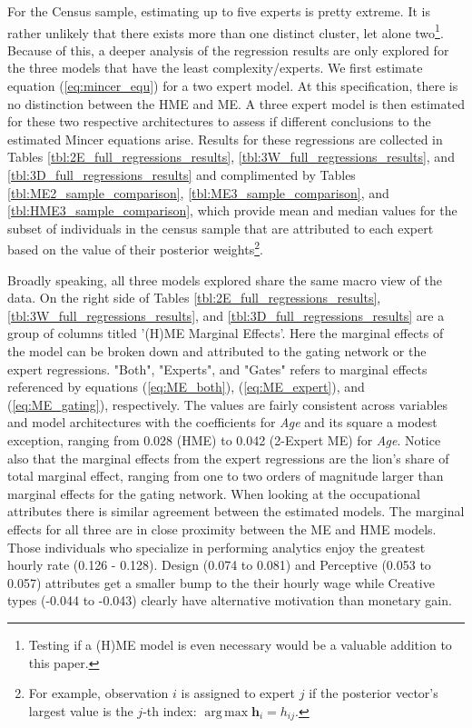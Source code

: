 \documentclass[12pt]{article}
\DeclareMathOperator*{\argmax}{arg\,max}
\theoremstyle{definition}
\begin{document}
\bigskip

For the Census sample, estimating up to five experts is pretty extreme.
It is rather unlikely that there exists more than one distinct cluster, let alone two\footnote{Testing if a (H)ME model is even necessary would be a valuable addition to this paper.}.
Because of this, a deeper analysis of the regression results are only explored
for the three models that have the least complexity/experts. We first estimate equation (\ref{eq:mincer_equ}) 
for a two expert model. At this specification, there is no distinction
between the HME and ME. A three expert model is then estimated for these two
respective architectures to assess if different conclusions to the estimated
Mincer equations arise. Results for these regressions are collected in Tables \ref{tbl:2E_full_regressions_results},
\ref{tbl:3W_full_regressions_results}, and \ref{tbl:3D_full_regressions_results}
and complimented by Tables \ref{tbl:ME2_sample_comparison}, \ref{tbl:ME3_sample_comparison},
and \ref{tbl:HME3_sample_comparison}, which provide mean and median values for the subset of individuals
in the census sample that are attributed to each expert based on the value of
their posterior weights\footnote{For example, observation $i$ is assigned to expert $j$ if the posterior vector's largest value is the $j$-th index: $\argmax \boldsymbol{h}_{i} = h_{ij}$.}.

\bigskip

Broadly speaking, all three models explored share the same macro view of the data.
On the right side of Tables \ref{tbl:2E_full_regressions_results},
\ref{tbl:3W_full_regressions_results}, and \ref{tbl:3D_full_regressions_results}
are a group of columns titled '(H)ME Marginal Effects'.
Here the marginal effects of the model can be broken down and attributed to the
gating network or the expert regressions. "Both", "Experts", and "Gates" refers to marginal effects referenced by equations
(\ref{eq:ME_both}), (\ref{eq:ME_expert}), and (\ref{eq:ME_gating}),
respectively. The values are fairly consistent across variables and model
architectures with the coefficients for \textit{Age} and its square a modest exception,
ranging from 0.028 (HME) to 0.042 (2-Expert ME) for \textit{Age}. Notice also that the
marginal effects from the expert regressions are the lion's share of total marginal effect,
ranging from one to two orders of magnitude larger than marginal effects for the gating
network. When looking at the occupational attributes there is similar agreement between
the estimated models. The marginal effects for all three are in close proximity between
the ME and HME models. Those individuals who specialize in performing analytics
enjoy the greatest hourly rate (0.126 - 0.128). Design (0.074 to 0.081) and 
Perceptive (0.053 to 0.057) attributes get a smaller bump to the their hourly
wage while Creative types (-0.044 to -0.043) clearly have alternative motivation than
monetary gain.
\end{document}

